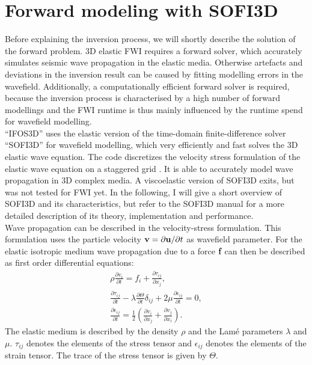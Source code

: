 \section{Forward modeling with SOFI3D}
Before explaining the inversion process, we will shortly describe the solution of the forward problem. 3D  elastic FWI requires a forward solver, which accurately simulates seismic wave propagation in the elastic media. Otherwise artefacts and deviations in the inversion result can be caused by fitting modelling errors in the wavefield. Additionally, a computationally efficient forward solver is required, because the inversion process is characterised by a high number of forward modellings and the FWI runtime is thus mainly influenced by the runtime spend for wavefield modelling. \\
``IFOS3D'' uses the elastic version of the time-domain finite-difference solver ``SOFI3D'' \citep{boh02} for wavefield modelling, which very efficiently and fast solves the 3D elastic wave equation. The code discretizes the velocity stress formulation of the elastic wave equation on a staggered grid \citep{Vir86, Lev88}. It is able to accurately model wave propagation in 3D complex media. A viscoelastic version of SOFI3D exits, but was not tested for FWI yet. In the following, I will give a short overview of SOFI3D and its characteristics, but refer to the SOFI3D manual for a more detailed description of its theory, implementation and performance.\\
Wave propagation can be described in the velocity-stress formulation. This formulation uses the particle velocity $\textbf v=\partial\textbf u/\partial t$ as wavefield parameter. For the elastic isotropic medium wave propagation due to a force $\textbf f$ can then be described as first order differential equations:
\begin{equation}
 \begin{split}
  \rho\frac{\partial v_i}{\partial t}=f_i+\frac{\partial\tau_{ij}}{\partial x_j},\\
\frac{\partial\tau_{ij}}{\partial t}-\lambda\frac{\partial\Theta}{\partial t}\delta_{ij}+2\mu\frac{\partial\epsilon_{ij}}{\partial t}=0,\\
\frac{\partial\epsilon_{ij}}{\partial t}=\frac{1}{2}\left (\frac{\partial v_i}{\partial x_j}+\frac{\partial v_j}{\partial x_i}\right ).
 \end{split}\label{equ:wave_equvel}
\end{equation}
The elastic medium is described by the density $\rho$ and the Lam\'e parameters $\lambda$ and $\mu$. $\tau_{ij}$ denotes the elements of the stress tensor and $\epsilon_{ij}$ denotes the elements of the strain tensor. The trace of the stress tensor is given by $\Theta$.
